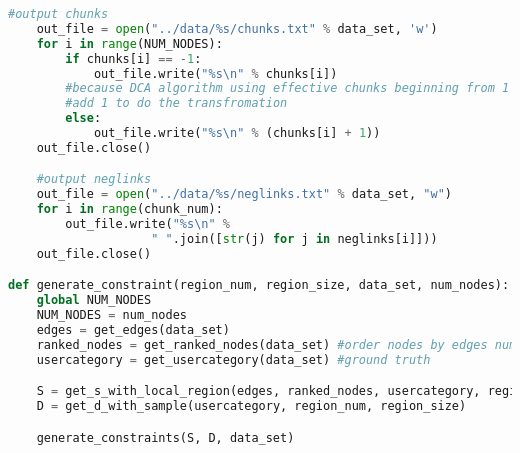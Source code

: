 \begin{lstlisting}[language={python}, caption={生成正语境限制和负语境限制}, label=code:constraint]
    #output chunks
    out_file = open("../data/%s/chunks.txt" % data_set, 'w')
    for i in range(NUM_NODES):
        if chunks[i] == -1:
            out_file.write("%s\n" % chunks[i])
        #because DCA algorithm using effective chunks beginning from 1
        #add 1 to do the transfromation
        else:
            out_file.write("%s\n" % (chunks[i] + 1))
    out_file.close()

    #output neglinks
    out_file = open("../data/%s/neglinks.txt" % data_set, "w")
    for i in range(chunk_num):
        out_file.write("%s\n" %
                    " ".join([str(j) for j in neglinks[i]]))
    out_file.close()

def generate_constraint(region_num, region_size, data_set, num_nodes):
    global NUM_NODES
    NUM_NODES = num_nodes
    edges = get_edges(data_set)
    ranked_nodes = get_ranked_nodes(data_set) #order nodes by edges number
    usercategory = get_usercategory(data_set) #ground truth

    S = get_s_with_local_region(edges, ranked_nodes, usercategory, region_num, region_size)
    D = get_d_with_sample(usercategory, region_num, region_size)

    generate_constraints(S, D, data_set)

\end{lstlisting}


